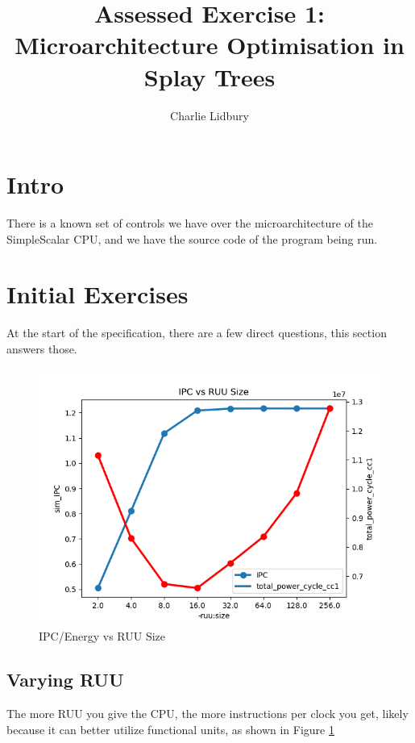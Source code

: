 \documentclass{article}
\begin{document}
\title{Assessed Exercise 1: Microarchitecture Optimisation in Splay Trees}
\author{Charlie Lidbury}
\maketitle

\begin{multicols}{2}

  \section{Intro}
  There is a known set of controls we have over the microarchitecture of the SimpleScalar CPU, and we have the source code of the program being run.

  \section{Initial Exercises}
  At the start of the specification, there are a few direct questions, this section answers those.

  \begin{figure}[H]
    \centering
    \includegraphics[width=\linewidth]{./assets/ipc_vs_ruu_size.png}
    \caption{IPC/Energy vs RUU Size}
    \label{fig:ipc_energy_vs_ruu}
  \end{figure}

  \subsection{Varying RUU}
  The more RUU you give the CPU, the more instructions per clock you get, likely because it can better utilize functional units, as shown in Figure \ref{fig:ipc_energy_vs_ruu}


\end{multicols}
\end{document}
